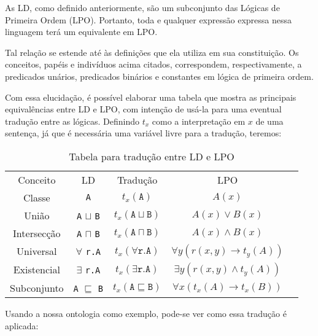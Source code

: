 As LD, como definido anteriormente, são um subconjunto das Lógicas de Primeira Ordem (LPO). Portanto, toda e qualquer expressão expressa nessa linguagem terá um equivalente em LPO. 

Tal relação se estende até às definições que ela utiliza em sua constituição. Os conceitos, papéis e indivíduos acima citados, correspondem, respectivamente, a predicados unários, predicados binários e constantes em lógica de primeira ordem.

Com essa elucidação, é possível elaborar uma tabela que mostra as principais equivalências entre LD e LPO, com intenção de usá-la para uma eventual tradução entre as lógicas. Definindo $t_x$ como a interpretação em $x$ de uma sentença, já que é necessária uma variável livre para a tradução, teremos:

\begin{table}[H]
	\centering
	\begin{tabular}{|c|c|c|c|l}
		\cline{1-4}
		Conceito    & LD                                    & Tradução                                 & LPO                              &  \\ \cline{1-4}
		Classe      & \texttt{A}                            & $t_x(\texttt{A})$                        & $A(x)$                           &  \\ \cline{1-4}
		União       & \texttt{A} $ \sqcup $ \texttt{B}      & $t_x(\texttt{A} \sqcup \texttt{B})$      & $A(x) \lor B(x)$                 &  \\ \cline{1-4}
		Intersecção & \texttt{A} $ \sqcap $ \texttt{B}      & $t_x(\texttt{A} \sqcap \texttt{B})$      & $A(x) \land B(x)$                &  \\ \cline{1-4}
		Universal   & $\forall$ \texttt{r.A}                & $t_x(\forall \texttt{r.A})$              & $\forall y(r(x,y) \to t_y(A))$   &  \\ \cline{1-4}
		Existencial & $\exists$ \texttt{r.A}                & $t_x(\exists \texttt{r.A})$              & $\exists y(r(x,y) \land t_y(A))$ &  \\ \cline{1-4}
		Subconjunto & \texttt{A} $ \sqsubseteq $ \texttt{B} & $t_x(\texttt{A} \sqsubseteq \texttt{B})$ & $\forall x(t_x(A) \to t_x(B))$   &  \\ \cline{1-4}
	\end{tabular}
	\caption{Tabela para tradução entre LD e LPO}
\end{table}

Usando a nossa ontologia como exemplo, pode-se ver como essa tradução é aplicada:

